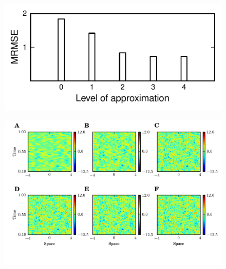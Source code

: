 \documentclass[review,authoryear,3p]{elsarticle}
\begin{document}
  \clearpage
  \newpage
   \begin{figure}[!t]	 
   	\centering
   		\includegraphics[scale=1]{Graph/fig10.pdf}
   		\caption{}
  \label{fig:RMSE}
   \end{figure}
   \clearpage
  \newpage
  \begin{figure}[t]
  	\centering
  		\includegraphics[scale=1]{Graph/fig11.png}
  	\caption{} 
  \label{fig:FieldEstimation}
  \end{figure}        
\clearpage
\newpage   
\appendix
\end{document}
